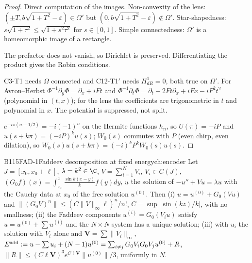 \begin{proof}
Direct computation of the images. Non-convexity of the lens: $(\pm T,b\sqrt{1+T^2}-\varepsilon)\in\Omega'$ but $(0,b\sqrt{1+T^2}-\varepsilon)\notin\Omega'$. Star-shapedness: $s\sqrt{1+\tau^2}\le\sqrt{1+s^2\tau^2}$ for $s\in[0,1]$. Simple connectedness: $\Omega'$ is a homeomorphic image of a rectangle.

The prefactor does not vanish, so Dirichlet is preserved. Differentiating the product gives the Robin conditions.

C3-T1 needs $\Omega$ connected and C12-T1$'$ needs $H^1_{dR}=0$, both true on $\Omega'$. For Avron--Herbst $\Phi^{-1}\partial_y\Phi=\partial_x+iFt$ and $\Phi^{-1}\partial_t\Phi=\partial_t-2Ft\partial_x+iFx-iF^2t^2$ (polynomial in $(t,x)$); for the lens the coefficients are trigonometric in $t$ and polynomial in $x$. The potential is suppressed, not split.

$e^{-i\pi(n+1/2)}=-i(-1)^n$ on the Hermite functions $h_n$, so $U(\pi)=-iP$ and $u(s+k\pi)=(-iP)^ku(s)$; $W_0(s)$ commutes with $P$ (even chirp, even dilation), so $W_0(s)u(s+k\pi)=(-i)^kP^kW_0(s)u(s)$.

\end{proof}

\begin{dimcard}{B115}{FAD-1}{Faddeev decomposition at fixed energy}{\pw}{ch:encoder}
Let $J=[x_0,x_0+\ell]$, $\lambda=k^2\in\C$, $V=\sum_{i=1}^NV_i$, $V_i\in C(J)$, $(G_0f)(x)=\int_{x_0}^x\frac{\sin k(x-y)}kf(y)dy$, $u$ the solution of $-u''+Vu=\lambda u$ with the Cauchy data at $x_0$ of the free solution $u^{(0)}$. Then (i) $u=u^{(0)}+G_0(Vu)$ and $\|(G_0V)^n\|\le(C\|V\|_\infty\ell)^n/n!$, $C=\sup|\sin(kz)/k|$, with no smallness; (ii) the Faddeev components $u^{(i)}=G_0(V_iu)$ satisfy $u=u^{(0)}+\sum u^{(i)}$ and the $N\times N$ system has a unique solution; (iii) with $u_i$ the solution with $V_i$ alone and $\mathbf V=\sum\|V_i\|_\infty$, $E^{\rm add}:=u-\sum u_i+(N-1)u^{(0)}=\sum_{i\ne j}G_0V_iG_0V_ju^{(0)}+R$, $\|R\|\le(C\ell\mathbf V)^3e^{C\ell\mathbf V}\|u^{(0)}\|/3$, uniformly in $N$.
\end{dimcard}

